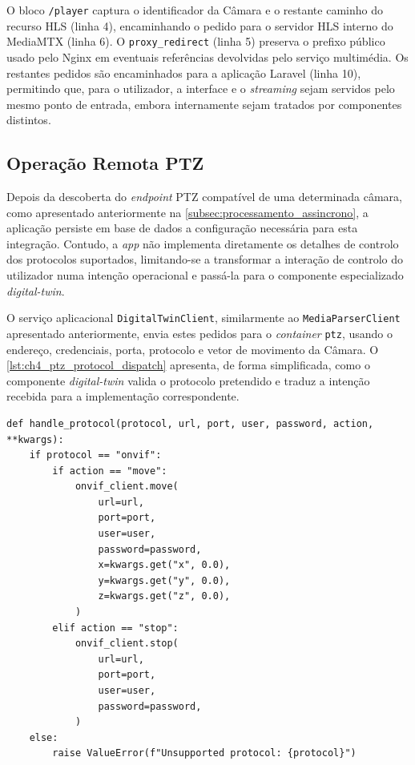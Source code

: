O bloco \texttt{/player} captura o identificador da Câmara e o restante caminho do recurso \gls{HLS} (linha 4), encaminhando o pedido para o servidor \gls{HLS} interno do MediaMTX (linha 6). O \texttt{proxy\_redirect} (linha 5) preserva o prefixo público usado pelo Nginx em eventuais referências devolvidas pelo serviço multimédia. Os restantes pedidos são encaminhados para a aplicação Laravel (linha 10), permitindo que, para o utilizador, a interface e o \textit{streaming} sejam servidos pelo mesmo ponto de entrada, embora internamente sejam tratados por componentes distintos.

\subsection{Operação Remota PTZ}

Depois da descoberta do \textit{endpoint} \gls{PTZ} compatível de uma determinada câmara, como apresentado anteriormente na \autoref{subsec:processamento_assincrono}, a aplicação persiste em base de dados a configuração necessária para esta integração. Contudo, a \textit{app} não implementa diretamente os detalhes de controlo dos protocolos suportados, limitando-se a transformar a interação de controlo do utilizador numa intenção operacional e passá-la para o componente especializado \textit{digital-twin}.

O serviço aplicacional \texttt{DigitalTwinClient}, similarmente ao \texttt{MediaParserClient} apresentado anteriormente, envia estes pedidos para o \textit{container} \texttt{ptz}, usando o endereço, credenciais, porta, protocolo e vetor de movimento da Câmara. O \autoref{lst:ch4_ptz_protocol_dispatch} apresenta, de forma simplificada, como o componente \textit{digital-twin} valida o protocolo pretendido e traduz a intenção recebida para a implementação correspondente.

\par\noindent\begin{minipage}{\linewidth}
\begin{lstlisting}[caption={Excerto simplificado de encaminhamento de controlo PTZ (python)},label={lst:ch4_ptz_protocol_dispatch}]
def handle_protocol(protocol, url, port, user, password, action, **kwargs):
    if protocol == "onvif":
        if action == "move":
            onvif_client.move(
                url=url,
                port=port,
                user=user,
                password=password,
                x=kwargs.get("x", 0.0),
                y=kwargs.get("y", 0.0),
                z=kwargs.get("z", 0.0),
            )
        elif action == "stop":
            onvif_client.stop(
                url=url,
                port=port,
                user=user,
                password=password,
            )
    else:
        raise ValueError(f"Unsupported protocol: {protocol}")
\end{lstlisting}
\end{minipage}

